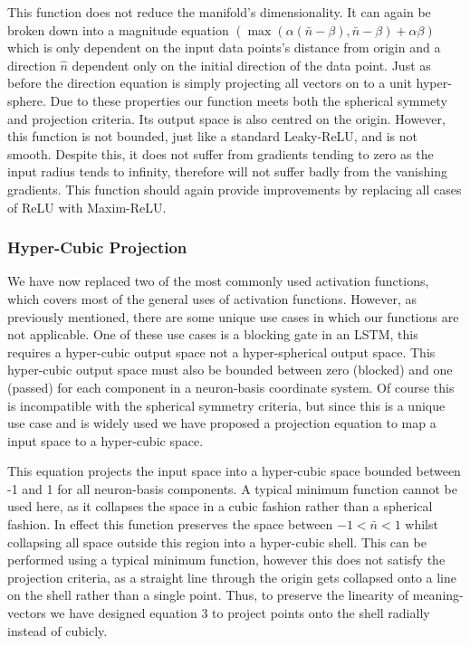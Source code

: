 \documentclass[onecolumn]{article}
\begin{document}
   This function does not reduce the manifold's dimensionality. It can again be broken down into a magnitude equation $\left(\max\left(\alpha\left(\bar{n}-\beta\right),\bar{n}-\beta\right)+\alpha\beta\right)$ which is only dependent on the input data points's distance from origin and a direction $\hat{n}$ dependent only on the initial direction of the data point. Just as before the direction equation is simply projecting all vectors on to a unit hyper-sphere. Due to these properties our function meets both the spherical symmety and projection criteria. Its output space is also centred on the origin. However, this function is not bounded, just like a standard Leaky-ReLU, and is not smooth. Despite this, it does not suffer from gradients tending to zero as the input radius tends to infinity, therefore will not suffer badly from the vanishing gradients. This function should again provide improvements by replacing all cases of ReLU with Maxim-ReLU.
    
    \subsubsection{Hyper-Cubic Projection}
    
    We have now replaced two of the most commonly used activation functions, which covers most of the general uses of activation functions. However, as previously mentioned, there are some unique use cases in which our functions are not applicable. One of these use cases is a blocking gate in an LSTM, this requires a hyper-cubic output space not a hyper-spherical output space. This hyper-cubic output space must also be bounded between zero (blocked) and one (passed) for each component in a neuron-basis coordinate system. Of course this is incompatible with the spherical symmetry criteria, but since this is a unique use case and is widely used we have proposed a projection equation to map a input space to a hyper-cubic space.

    This equation projects the input space into a hyper-cubic space bounded between -1 and 1 for all neuron-basis components. A typical minimum function cannot be used here, as it collapses the space in a cubic fashion rather than a spherical fashion. In effect this function preserves the space between $-1<\bar{n}<1$ whilst collapsing all space outside this region into a hyper-cubic shell. This can be performed using a typical minimum function, however this does not satisfy the projection criteria, as a straight line through the origin gets collapsed onto a line on the shell rather than a single point. Thus, to preserve the linearity of meaning-vectors we have designed equation 3 to project points onto the shell radially instead of cubicly.
\end{document}
